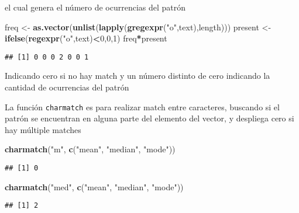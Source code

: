\documentclass[]{article}
\newenvironment{Shaded}{\begin{snugshade}}{\end{snugshade}}
\newcommand{\KeywordTok}[1]{\textcolor[rgb]{0.13,0.29,0.53}{\textbf{#1}}}
\newcommand{\DecValTok}[1]{\textcolor[rgb]{0.00,0.00,0.81}{#1}}
\newcommand{\StringTok}[1]{\textcolor[rgb]{0.31,0.60,0.02}{#1}}
\newcommand{\OperatorTok}[1]{\textcolor[rgb]{0.81,0.36,0.00}{\textbf{#1}}}
\newcommand{\NormalTok}[1]{#1}
\begin{document}
el cual genera el número de ocurrencias del patrón

\begin{Shaded}
\begin{Highlighting}[]
\NormalTok{freq <-}\StringTok{ }\KeywordTok{as.vector}\NormalTok{(}\KeywordTok{unlist}\NormalTok{(}\KeywordTok{lapply}\NormalTok{(}\KeywordTok{gregexpr}\NormalTok{(}\StringTok{"o"}\NormalTok{,text),length)))}
\NormalTok{present <-}\StringTok{ }\KeywordTok{ifelse}\NormalTok{(}\KeywordTok{regexpr}\NormalTok{(}\StringTok{"o"}\NormalTok{,text)}\OperatorTok{<}\DecValTok{0}\NormalTok{,}\DecValTok{0}\NormalTok{,}\DecValTok{1}\NormalTok{)}
\NormalTok{freq}\OperatorTok{*}\NormalTok{present}
\end{Highlighting}
\end{Shaded}

\begin{verbatim}
## [1] 0 0 0 2 0 0 1
\end{verbatim}

Indicando cero si no hay match y un número distinto de cero indicando la
cantidad de ocurrencias del patrón

La función \texttt{charmatch} es para realizar match entre caracteres,
buscando si el patrón se encuentran en alguna parte del elemento del
vector, y despliega cero si hay múltiple matches

\begin{Shaded}
\begin{Highlighting}[]
\KeywordTok{charmatch}\NormalTok{(}\StringTok{"m"}\NormalTok{, }\KeywordTok{c}\NormalTok{(}\StringTok{"mean"}\NormalTok{, }\StringTok{"median"}\NormalTok{, }\StringTok{"mode"}\NormalTok{))}
\end{Highlighting}
\end{Shaded}

\begin{verbatim}
## [1] 0
\end{verbatim}

\begin{Shaded}
\begin{Highlighting}[]
\KeywordTok{charmatch}\NormalTok{(}\StringTok{"med"}\NormalTok{, }\KeywordTok{c}\NormalTok{(}\StringTok{"mean"}\NormalTok{, }\StringTok{"median"}\NormalTok{, }\StringTok{"mode"}\NormalTok{))}
\end{Highlighting}
\end{Shaded}

\begin{verbatim}
## [1] 2
\end{verbatim}
\end{document}
